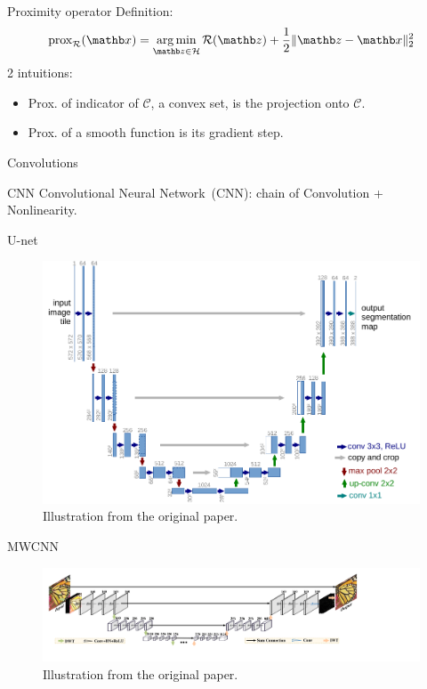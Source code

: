 \begin{frame}{Proximity operator}
    Definition:
    \begin{equation*}
        \operatorname{prox}_{\mathcal{R}}(\xb) = \argmin_{\zb \in \mathcal{H}} \mathcal{R}(\zb) + \frac12\|\zb - \xb\|_2^2
    \end{equation*}
    2 intuitions:
    \begin{itemize}
        \item Prox. of indicator of $\mathcal{C}$, a convex set, is the projection onto $\mathcal{C}$.
        \item Prox. of a smooth function is its gradient step.
    \end{itemize}
\end{frame}

\begin{frame}{Convolutions}

\end{frame}

\begin{frame}{CNN}
    Convolutional Neural Network~(CNN): chain of Convolution + Nonlinearity.
\end{frame}

\begin{frame}{U-net}
    \begin{figure}
        \centering
        \includegraphics[height=0.6\textheight]{Figures/add_slides/unet_hires.pdf}
        \caption{Illustration from the original paper.}
    \end{figure}
\end{frame}

\begin{frame}{MWCNN}
    \begin{figure}
        \centering
        \includegraphics[width=\textwidth]{Figures/add_slides/mwcnn.pdf}
        \caption{Illustration from the original paper.}
    \end{figure}
\end{frame}

